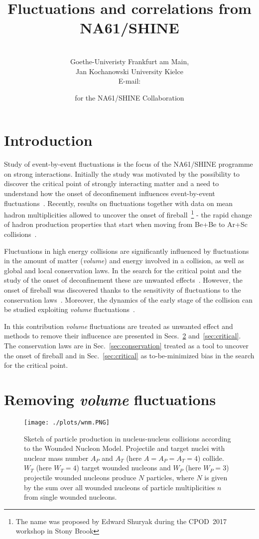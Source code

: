 \documentclass{PoS}
\title{Fluctuations and correlations  from NA61/SHINE}
\author{\speaker{Marek Gazdzicki}
	\\
	Goethe-Univeristy Frankfurt am Main,\\ 
	Jan Kochanowski University Kielce\\
	E-mail: \email{marek@cern.ch}}
\author{for the NA61/SHINE Collaboration }
\begin{document}
\section{Introduction}

Study of event-by-event fluctuations is the focus of the NA61/SHINE programme on strong interactions.
Initially the study was motivated by the possibility to discover the critical point of strongly interacting matter
and a need to understand how the onset of deconfinement influences event-by-event 
fluctuations~\cite{na61proposal}.
Recently, results on fluctuations together with data on mean hadron multiplicities allowed to
uncover the onset of fireball~\footnote{The name was proposed by Edward 
Shuryak during the CPOD~2017 workshop in Stony Brook} -  
the rapid change of hadron production properties that start when moving from Be+Be 
to Ar+Sc collisions~\cite{sr2017}. 

Fluctuations in high energy collisions are significantly influenced by fluctuations in the amount of matter
(\textit{volume}) and energy involved in a collision, 
as well as global and local conservation laws.
In the search for the critical point and the study of the onset of deconfinement these are
unwanted effects~\cite{critical}. However, the onset of fireball was discovered thanks to the sensitivity of 
fluctuations to the conservation laws~\cite{sr2017}. 
Moreover, the dynamics of the early stage of the collision can be studied exploiting
\textit{volume} fluctuations~\cite{mixing}.

In this contribution \textit{volume} fluctuations are treated as unwanted effect and methods to remove their
influcence are presented in Secs.~\ref{sec:volume} and~\ref{sec:critical}.
The conservation laws are in Sec.~\ref{sec:conservation} treated as a tool to uncover the onset of fireball
and in Sec.~\ref{sec:critical} as to-be-minimized bias in the search for the critical point.


\section{Removing \textit{volume} fluctuations}
\label{sec:volume}

\begin{figure}[h]
	\centering
	\texttt{[image: ./plots/wnm.PNG]}
	\caption[]
	{
		Sketch of particle production in nucleus-nucleus collisions according to the Wounded Nucleon Model.
		Projectile and target nuclei with nuclear mass number $A_P$ and $A_T$ (here $A = A_P =A_T = 4$)
		collide. $W_T$ (here $ W_T = 4 $) target wounded nucleons and $W_P$ (here $ W_P = 3 $)
		projectile wounded nucleons produce $N$ particles, where $N$ is given by the sum over all 
                wounded nucleons of particle multiplicities $n$ from single wounded nucleons.
	}
	\label{fig:wnm}
\end{figure}
\end{document}
